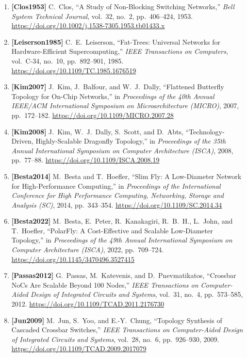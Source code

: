 \begin{enumerate}
    \item \textbf{[Clos1953]} C.~Clos, ``A Study of Non-Blocking Switching Networks,'' \emph{Bell System Technical Journal}, vol.~32, no.~2, pp.~406--424, 1953. \url{https://doi.org/10.1002/j.1538-7305.1953.tb01433.x}
    \item \textbf{[Leiserson1985]} C.~E.~Leiserson, ``Fat-Trees: Universal Networks for Hardware-Efficient Supercomputing,'' \emph{IEEE Transactions on Computers}, vol.~C-34, no.~10, pp.~892--901, 1985. \url{https://doi.org/10.1109/TC.1985.1676519}
    \item \textbf{[Kim2007]} J.~Kim, J.~Balfour, and W.~J.~Dally, ``Flattened Butterfly Topology for On-Chip Networks,'' in \emph{Proceedings of the 40th Annual IEEE/ACM International Symposium on Microarchitecture (MICRO)}, 2007, pp.~172--182. \url{https://doi.org/10.1109/MICRO.2007.28}
    \item \textbf{[Kim2008]} J.~Kim, W.~J.~Dally, S.~Scott, and D.~Abts, ``Technology-Driven, Highly-Scalable Dragonfly Topology,'' in \emph{Proceedings of the 35th Annual International Symposium on Computer Architecture (ISCA)}, 2008, pp.~77--88. \url{https://doi.org/10.1109/ISCA.2008.19}
    \item \textbf{[Besta2014]} M.~Besta and T.~Hoefler, ``Slim Fly: A Low-Diameter Network for High-Performance Computing,'' in \emph{Proceedings of the International Conference for High Performance Computing, Networking, Storage and Analysis (SC)}, 2014, pp.~343--354. \url{https://doi.org/10.1109/SC.2014.34}
    \item \textbf{[Besta2022]} M.~Besta, E.~Peter, R.~Kanakagiri, R.~B.~H., L.~John, and T.~Hoefler, ``PolarFly: A Cost-Effective and Scalable Low-Diameter Topology,'' in \emph{Proceedings of the 49th Annual International Symposium on Computer Architecture (ISCA)}, 2022, pp.~709--724. \url{https://doi.org/10.1145/3470496.3527415}
    \item \textbf{[Passas2012]} G.~Passas, M.~Katevenis, and D.~Pnevmatikatos, ``Crossbar NoCs Are Scalable Beyond 100 Nodes,'' \emph{IEEE Transactions on Computer-Aided Design of Integrated Circuits and Systems}, vol.~31, no.~4, pp.~573--585, 2012. \url{https://doi.org/10.1109/TCAD.2011.2176730}
    \item \textbf{[Jun2009]} M.~Jun, S.~Yoo, and E.-Y.~Chung, ``Topology Synthesis of Cascaded Crossbar Switches,'' \emph{IEEE Transactions on Computer-Aided Design of Integrated Circuits and Systems}, vol.~28, no.~6, pp.~926--930, 2009. \url{https://doi.org/10.1109/TCAD.2009.2017079}

\end{enumerate}
